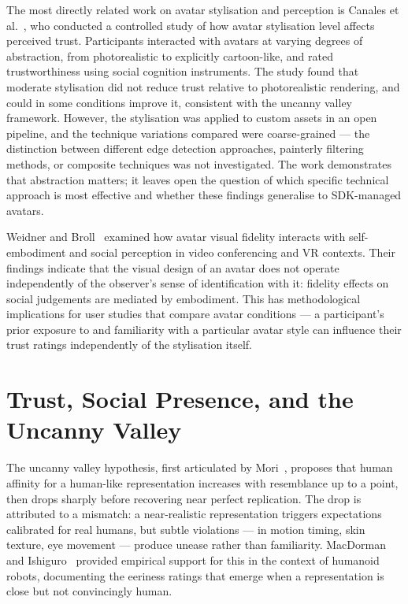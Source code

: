The most directly related work on avatar stylisation and perception is Canales et al.~\cite{canales2024}, who conducted a controlled study of how avatar stylisation level affects perceived trust. Participants interacted with avatars at varying degrees of abstraction, from photorealistic to explicitly cartoon-like, and rated trustworthiness using social cognition instruments. The study found that moderate stylisation did not reduce trust relative to photorealistic rendering, and could in some conditions improve it, consistent with the uncanny valley framework. However, the stylisation was applied to custom assets in an open pipeline, and the technique variations compared were coarse-grained — the distinction between different edge detection approaches, painterly filtering methods, or composite techniques was not investigated. The work demonstrates that abstraction matters; it leaves open the question of which specific technical approach is most effective and whether these findings generalise to SDK-managed avatars.

Weidner and Broll~\cite{weidner2023} examined how avatar visual fidelity interacts with self-embodiment and social perception in video conferencing and VR contexts. Their findings indicate that the visual design of an avatar does not operate independently of the observer's sense of identification with it: fidelity effects on social judgements are mediated by embodiment. This has methodological implications for user studies that compare avatar conditions — a participant's prior exposure to and familiarity with a particular avatar style can influence their trust ratings independently of the stylisation itself.

\section{Trust, Social Presence, and the Uncanny Valley}
\label{sec:related_vr_trust}

The uncanny valley hypothesis, first articulated by Mori~\cite{mori1970}, proposes that human affinity for a human-like representation increases with resemblance up to a point, then drops sharply before recovering near perfect replication. The drop is attributed to a mismatch: a near-realistic representation triggers expectations calibrated for real humans, but subtle violations — in motion timing, skin texture, eye movement — produce unease rather than familiarity. MacDorman and Ishiguro~\cite{macdorman2006} provided empirical support for this in the context of humanoid robots, documenting the eeriness ratings that emerge when a representation is close but not convincingly human.

